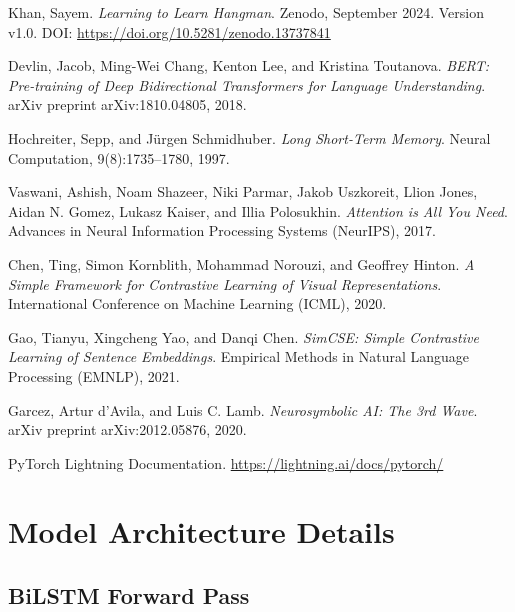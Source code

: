 \documentclass[12pt,a4paper]{article}
\begin{document}
\begin{thebibliography}{9}

Khan, Sayem.
\textit{Learning to Learn Hangman}.
Zenodo, September 2024.
Version v1.0.
DOI: \url{https://doi.org/10.5281/zenodo.13737841}

Devlin, Jacob, Ming-Wei Chang, Kenton Lee, and Kristina Toutanova.
\textit{BERT: Pre-training of Deep Bidirectional Transformers for Language Understanding}.
arXiv preprint arXiv:1810.04805, 2018.

Hochreiter, Sepp, and J{\"u}rgen Schmidhuber.
\textit{Long Short-Term Memory}.
Neural Computation, 9(8):1735--1780, 1997.

Vaswani, Ashish, Noam Shazeer, Niki Parmar, Jakob Uszkoreit, Llion Jones, Aidan N. Gomez, Lukasz Kaiser, and Illia Polosukhin.
\textit{Attention is All You Need}.
Advances in Neural Information Processing Systems (NeurIPS), 2017.

Chen, Ting, Simon Kornblith, Mohammad Norouzi, and Geoffrey Hinton.
\textit{A Simple Framework for Contrastive Learning of Visual Representations}.
International Conference on Machine Learning (ICML), 2020.

Gao, Tianyu, Xingcheng Yao, and Danqi Chen.
\textit{SimCSE: Simple Contrastive Learning of Sentence Embeddings}.
Empirical Methods in Natural Language Processing (EMNLP), 2021.

Garcez, Artur d'Avila, and Luis C. Lamb.
\textit{Neurosymbolic AI: The 3rd Wave}.
arXiv preprint arXiv:2012.05876, 2020.

PyTorch Lightning Documentation.
\url{https://lightning.ai/docs/pytorch/}

\end{thebibliography}

\appendix

\section{Model Architecture Details}

\subsection{BiLSTM Forward Pass}
\end{document}
